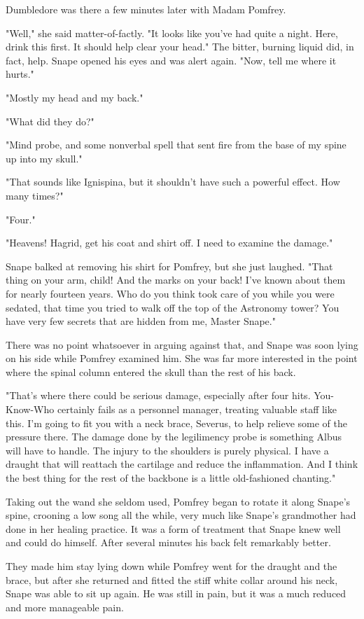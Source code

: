 Dumbledore was there a few minutes later with Madam Pomfrey.

"Well," she said matter-of-factly. "It looks like you've had quite a night. Here, drink this first. It should help clear your head." The bitter, burning liquid did, in fact, help. Snape opened his eyes and was alert again. "Now, tell me where it hurts."

"Mostly my head and my back."

"What did they do?"

"Mind probe, and some nonverbal spell that sent fire from the base of my spine up into my skull."

"That sounds like Ignispina, but it shouldn't have such a powerful effect. How many times?"

"Four."

"Heavens! Hagrid, get his coat and shirt off. I need to examine the damage."

Snape balked at removing his shirt for Pomfrey, but she just laughed. "That thing on your arm, child! And the marks on your back! I've known about them for nearly fourteen years. Who do you think took care of you while you were sedated, that time you tried to walk off the top of the Astronomy tower? You have very few secrets that are hidden from me, Master Snape."

There was no point whatsoever in arguing against that, and Snape was soon lying on his side while Pomfrey examined him. She was far more interested in the point where the spinal column entered the skull than the rest of his back.

"That's where there could be serious damage, especially after four hits. You-Know-Who certainly fails as a personnel manager, treating valuable staff like this. I'm going to fit you with a neck brace, Severus, to help relieve some of the pressure there. The damage done by the legilimency probe is something Albus will have to handle. The injury to the shoulders is purely physical. I have a draught that will reattach the cartilage and reduce the inflammation. And I think the best thing for the rest of the backbone is a little old-fashioned chanting."

Taking out the wand she seldom used, Pomfrey began to rotate it along Snape's spine, crooning a low song all the while, very much like Snape's grandmother had done in her healing practice. It was a form of treatment that Snape knew well and could do himself. After several minutes his back felt remarkably better.

They made him stay lying down while Pomfrey went for the draught and the brace, but after she returned and fitted the stiff white collar around his neck, Snape was able to sit up again. He was still in pain, but it was a much reduced and more manageable pain.

